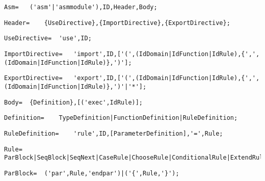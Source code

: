 \documentclass{article}
\begin{document}
    \begin{lstlisting}[mathescape=true]
     Asm= 	('asm'|'asmmodule'),ID,Header,Body;
    \end{lstlisting}
    
    \begin{lstlisting}[mathescape=true]
     Header= 	{UseDirective},{ImportDirective},{ExportDirective};
    \end{lstlisting}
    
    \begin{lstlisting}[mathescape=true]
     UseDirective= 	'use',ID;
    \end{lstlisting}
    
    \begin{lstlisting}[mathescape=true]
     ImportDirective= 	'import',ID,['(',(IdDomain|IdFunction|IdRule),{',',(IdDomain|IdFunction|IdRule)},')'];
    \end{lstlisting}
    
    \begin{lstlisting}[mathescape=true]
     ExportDirective= 	'export',ID,['(',(IdDomain|IdFunction|IdRule),{',',(IdDomain|IdFunction|IdRule)},')'|'*'];
    \end{lstlisting}
    
    \begin{lstlisting}[mathescape=true]
     Body= 	{Definition},[('exec',IdRule)];
    \end{lstlisting}
    
    \begin{lstlisting}[mathescape=true]
     Definition= 	TypeDefinition|FunctionDefinition|RuleDefinition;
    \end{lstlisting}
    
    \begin{lstlisting}[mathescape=true]
     RuleDefinition= 	'rule',ID,[ParameterDefinition],'=',Rule;
    \end{lstlisting}
    
    \begin{lstlisting}[mathescape=true]
     Rule= 	ParBlock|SeqBlock|SeqNext|CaseRule|ChooseRule|ConditionalRule|ExtendRule|ForAllRule|ImportRule|IterateRule|LetRule|TurboReturnRule|WhileRule|UpdateRule|SkipRule|CallRule|LocalRule|PrintRule;
    \end{lstlisting}
    
    \begin{lstlisting}[mathescape=true]
     ParBlock= 	('par',Rule,'endpar')|('{',Rule,'}');
    \end{lstlisting}
    
\end{document}
